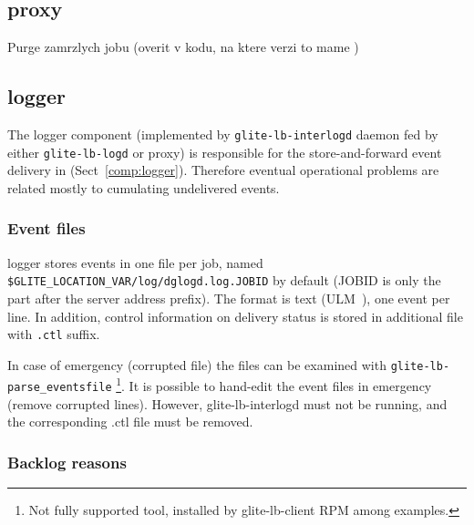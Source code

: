\subsection{\LB proxy}

Purge zamrzlych jobu (overit v kodu, na ktere verzi to mame )


\subsection{\LB logger}

\iffalse
\TODO{ljocha}

Karantena (od ktere verze to mame?)
- kdyz se nepodari rozparsovat soubor
- client/examples -- parse-logevent-file??, lze pouzit

Cistky pri zaseknuti, nesmyslna jobid apod.

Debugovaci rezim

Notifikacni IL
\fi

The logger component (implemented by \verb'glite-lb-interlogd' daemon fed by
either \verb'glite-lb-logd' or \LB proxy)
is responsible for the store-and-forward event delivery in \LB
(Sect~\ref{comp:logger}).
Therefore eventual operational problems are related mostly to 
cumulating undelivered events.

\subsubsection{Event files}

\LB logger stores events in one file per job, named
\verb'$GLITE_LOCATION_VAR/log/dglogd.log.JOBID' by default
(JOBID is only the part after the \LB server address prefix).
The format is text (ULM~\cite{ulm}), one event per line.
In addition, control information on delivery status is stored in additional
file with \verb'.ctl' suffix.

\begin{sloppypar}
In case of emergency (\eg corrupted file) the files can be examined
with \verb'glite-lb-parse_eventsfile'%
\footnote{Not fully supported tool, installed by glite-lb-client RPM among examples.}.
It is possible to hand-edit the event files in emergency (remove corrupted lines).
However, glite-lb-interlogd must not be running, and the corresponding .ctl file
must be removed.
\end{sloppypar}

\subsubsection{Backlog reasons}

